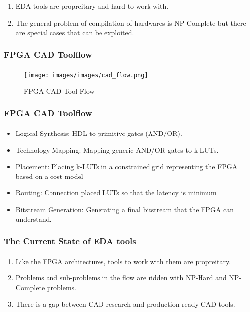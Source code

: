 \documentclass{beamer}
\begin{document}
{\begin{frame}[fragile]
\begin{enumerate}
    \item EDA tools are propreitary and hard-to-work-with.
    \item The general problem of compilation of hardwares is NP-Complete but
      there are special cases that can be exploited.
  \end{enumerate}
\end{frame}

\begin{frame}[fragile]
  \frametitle{FPGA CAD Toolflow}
  \framesubtitle{}
   \begin{figure}
        \centering
        \texttt{[image: images/images/cad\_flow.png]}
        \caption{FPGA CAD Tool Flow}
        \label{exa_cadflow}
    \end{figure}
\end{frame}

\begin{frame}[fragile]
  \frametitle{FPGA CAD Toolflow}
  \framesubtitle{}
   \begin{itemize}
     \item Logical Synthesis: HDL to primitive gates (AND/OR).
     \item Technology Mapping: Mapping generic AND/OR gates to k-LUTs.
     \item Placement: Placing k-LUTs in a constrained grid representing the FPGA
       based on a cost model
     \item Routing: Connection placed LUTs so that the latency is minimum
     \item Bitstream Generation: Generating a final bitstream that the FPGA
       can understand.
    \end{itemize}
\end{frame}

\begin{frame}[fragile]
  \frametitle{The Current State of EDA tools}
  \framesubtitle{}
  \begin{enumerate}
    \item Like the FPGA architectures, tools to work with them are propreitary.
    \item Problems and sub-problems in the flow are ridden with NP-Hard and
      NP-Complete problems.
    \item There is a gap between CAD research and production ready CAD tools.
  \end{enumerate}
\end{frame}

}
\end{document}
